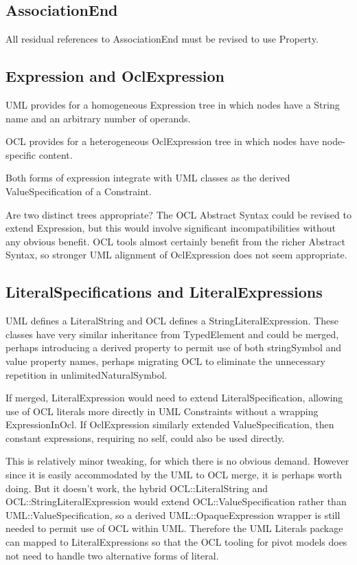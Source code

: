 \documentclass{eceasst}
\begin{document}
\subsection{AssociationEnd}

All residual references to AssociationEnd must be revised to use Property.

\subsection{Expression and OclExpression}

UML provides for a homogeneous Expression tree in which nodes have a String name and an arbitrary number of operands.

OCL provides for a heterogeneous OclExpression tree in which nodes have node-specific content.

Both forms of expression integrate with UML classes as the derived ValueSpecification of a Constraint.

Are two distinct trees appropriate? The OCL Abstract Syntax could be revised to extend Expression, but this would involve significant incompatibilities without any obvious benefit. OCL tools almost certainly benefit from the richer Abstract Syntax, so stronger UML alignment of OclExpression does not seem appropriate.

\subsection{LiteralSpecifications and LiteralExpressions}

UML defines a LiteralString and OCL defines a StringLiteralExpression. These classes have very similar inheritance from TypedElement and could be merged, perhaps introducing a derived property to permit use of both stringSymbol and value property names, perhaps migrating OCL to eliminate the unnecessary repetition in unlimitedNaturalSymbol.

If merged, LiteralExpression would need to extend LiteralSpecification, allowing use of OCL literals more directly in UML Constraints without a wrapping ExpressionInOcl. If OclExpression similarly extended ValueSpecification, then constant expressions, requiring no self, could also be used directly.

This is relatively minor tweaking, for which there is no obvious demand. However since it is easily accommodated by the UML to OCL merge, it is perhaps worth doing. But it doesn't work, the hybrid OCL::LiteralString and OCL::StringLiteralExpression would extend OCL::ValueSpecification rather than UML::ValueSpecification, so a derived UML::OpaqueExpression wrapper is still needed to permit use of OCL within UML. Therefore the UML Literals package can mapped to LiteralExpressions so that the OCL tooling for pivot models does not need to handle two alternative forms of literal. 
\end{document}
